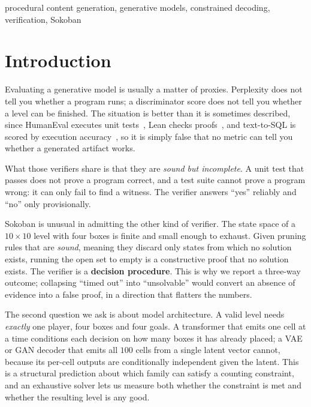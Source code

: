 \documentclass[conference]{IEEEtran}
\begin{document}
\begin{IEEEkeywords}
procedural content generation, generative models, constrained decoding,
verification, Sokoban
\end{IEEEkeywords}

\section{Introduction}

Evaluating a generative model is usually a matter of proxies. Perplexity does
not tell you whether a program runs; a discriminator score does not tell you
whether a level can be finished. The situation is better than it is sometimes
described, since HumanEval executes unit tests~\cite{chen2021codex}, Lean checks
proofs~\cite{demoura2021lean}, and text-to-SQL is scored by execution
accuracy~\cite{yu2018spider}, so it is simply false that no metric can tell
you whether a generated artifact works.

What those verifiers share is that they are \emph{sound but incomplete}. A unit
test that passes does not prove a program correct, and a test suite cannot prove
a program wrong: it can only fail to find a witness. The verifier answers ``yes''
reliably and ``no'' only provisionally.

Sokoban is unusual in admitting the other kind of verifier. The state space of a
$10\times10$ level with four boxes is finite and small enough to exhaust. Given
pruning rules that are \emph{sound}, meaning they discard only states from which
no solution exists, running the open set to empty is a constructive proof that
no solution exists. The verifier is a \textbf{decision procedure}. This is why
we report a three-way outcome; collapsing ``timed out'' into ``unsolvable'' would
convert an absence of evidence into a false proof, in a direction that
flatters the numbers.

The second question we ask is about model architecture. A valid level needs
\emph{exactly} one player, four boxes and four goals. A transformer that emits
one cell at a time conditions each decision on how many boxes it has already
placed; a VAE or GAN decoder that emits all $100$ cells from a single latent
vector cannot, because its per-cell outputs are conditionally independent given
the latent. This is a structural prediction about which family can satisfy a
counting constraint, and an exhaustive solver lets us measure both whether the
constraint is met and whether the resulting level is any good.
\end{document}
